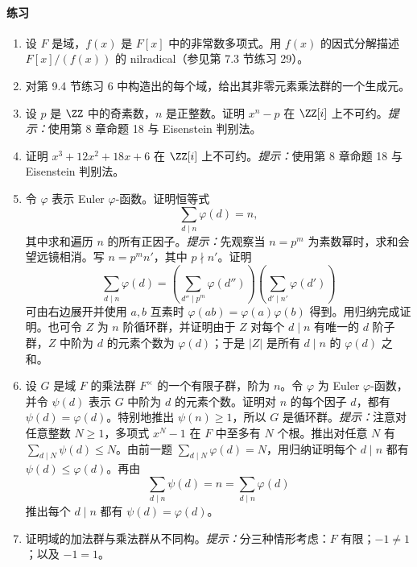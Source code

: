 \paragraph{练习}
\begin{enumerate}[label=\arabic*.]
	\item 设 $F$ 是域，$f(x)$ 是 $F[x]$ 中的非常数多项式。用 $f(x)$ 的因式分解描述 $F[x]/(f(x))$ 的 nilradical（参见第 7.3 节练习 29）。
	
	\item 对第 9.4 节练习 6 中构造出的每个域，给出其非零元素乘法群的一个生成元。
	
	\item 设 $p$ 是 $\ZZ$ 中的奇素数，$n$ 是正整数。证明 $x^n-p$ 在 $\ZZ[i]$ 上不可约。\emph{提示：}使用第 8 章命题 18 与 Eisenstein 判别法。
	
	\item 证明 $x^3+12x^2+18x+6$ 在 $\ZZ[i]$ 上不可约。\emph{提示：}使用第 8 章命题 18 与 Eisenstein 判别法。
	
	\item 令 $\varphi$ 表示 Euler $\varphi$-函数。证明恒等式
	\[
	\sum_{d\mid n}\varphi(d)=n,
	\]
	其中求和遍历 $n$ 的所有正因子。\emph{提示：}先观察当 $n=p^m$ 为素数幂时，求和会望远镜相消。写 $n=p^m n'$，其中 $p\nmid n'$。证明
	\[
	\sum_{d\mid n}\varphi(d)=
	\left(\sum_{d''\mid p^m}\varphi(d'')\right)
	\left(\sum_{d'\mid n'}\varphi(d')\right)
	\]
	可由右边展开并使用 $a,b$ 互素时 $\varphi(ab)=\varphi(a)\varphi(b)$ 得到。用归纳完成证明。也可令 $Z$ 为 $n$ 阶循环群，并证明由于 $Z$ 对每个 $d\mid n$ 有唯一的 $d$ 阶子群，$Z$ 中阶为 $d$ 的元素个数为 $\varphi(d)$；于是 $|Z|$ 是所有 $d\mid n$ 的 $\varphi(d)$ 之和。
	
	\item 设 $G$ 是域 $F$ 的乘法群 $F^\times$ 的一个有限子群，阶为 $n$。令 $\varphi$ 为 Euler $\varphi$-函数，并令 $\psi(d)$ 表示 $G$ 中阶为 $d$ 的元素个数。证明对 $n$ 的每个因子 $d$，都有 $\psi(d)=\varphi(d)$。特别地推出 $\psi(n)\geq1$，所以 $G$ 是循环群。\emph{提示：}注意对任意整数 $N\geq1$，多项式 $x^N-1$ 在 $F$ 中至多有 $N$ 个根。推出对任意 $N$ 有 $\sum_{d\mid N}\psi(d)\leq N$。由前一题 $\sum_{d\mid N}\varphi(d)=N$，用归纳证明每个 $d\mid n$ 都有 $\psi(d)\leq\varphi(d)$。再由
	\[
	\sum_{d\mid n}\psi(d)=n=\sum_{d\mid n}\varphi(d)
	\]
	推出每个 $d\mid n$ 都有 $\psi(d)=\varphi(d)$。
	
	\item 证明域的加法群与乘法群从不同构。\emph{提示：}分三种情形考虑：$F$ 有限；$-1\neq1$；以及 $-1=1$。
\end{enumerate}

